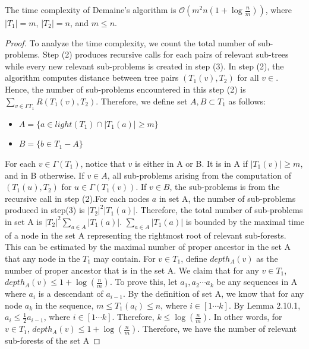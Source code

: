 \begin{lemma}
The time complexity of Demaine's algorithm is $\mathcal{O}(m^2n(1+\log{\frac{n}{m}}))$, where $\left\vert T_1 \right\vert =m$, $\left\vert T_2 \right\vert = n$, and $m \leq n$.
\end{lemma}
\begin{proof}
To analyze the time complexity, we count the total number of sub-problems. Step (2) produces recursive calls for each pairs of relevant sub-trees while every new relevant sub-problems is created in step (3). 
In step (2), the algorithm computes distance between tree pairs $(T_1(v), T_2)$ for all $v \in $. Hence, the number of sub-problems encountered in this step (2) is $\sum_{v \in \Gamma{T_1}}R(T_1(v), T_2)$. 
Therefore, we define set $A, B \subset T_1$ as follows:
\begin{itemize}
\item $A = \{a \in light(T_1) \cap \left\vert T_1(a) \right\vert \geq m \}$
\item $B = \{b \in T_1 - A\}$
\end{itemize}
For each $v \in \Gamma(T_1)$, notice that $v$ is either in A or B. It is in A if $\left\vert T_1(v) \right\vert \geq m$, and in B otherwise. If $v \in A$, all sub-problems arising from the computation of $(T_1(u), T_2)$ for $u \in \Gamma(T_1(v))$. If $v \in B$, the sub-problems is from the recursive call in step (2).For each nodes $a$ in set A, the number of sub-problems produced in step(3) is $\left\vert T_2 \right\vert^2\left\vert T_1(a) \right\vert$. Therefore, the total number of sub-problems in set A is $\left\vert T_2 \right\vert^2 \sum_{a \in A}\left\vert T_1(a) \right\vert$. $\sum_{a \in A}\left\vert T_1(a) \right\vert$ is bounded by the maximal time of a node in the set A representing the rightmost root of relevant sub-forests. This can be estimated by the maximal number of proper ancestor in the set A that any node in the $T_1$ may contain. For $v \in T_1$, define $depth_{A}(v)$ as the number of proper ancestor that is in the set A. We claim that for any $v \in T_1$, $depth_{A}(v) \leq 1 + \log(\frac{n}{m})$. To prove this, let $a_1, a_2 \cdots a_k$ be any sequences in A where $a_i$ is a descendant of $a_{i-1}$. By the definition of set A, we know that for any node $a_k$ in the sequence, $m \leq T_1(a_i) \leq n$, where $i \in [1 \cdots k]$. By Lemma 2.10.1, $a_i \leq \frac{1}{2}a_{i - 1}$, where $i \in [1 \cdots k]$. Therefore, $k \leq \log(\frac{n}{m})$. In other words, for $v \in T_1$, $depth_A(v) \leq 1 + \log(\frac{n}{m})$. Therefore, we have the number of relevant sub-forests of the set A

\end{proof}
